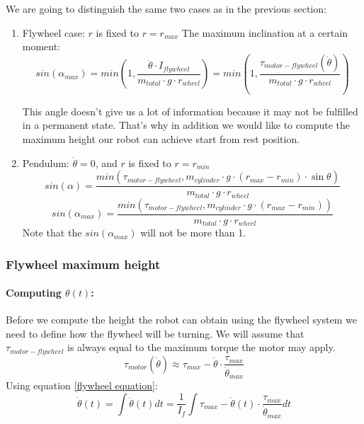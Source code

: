 We are going to distinguish the same two cases as in the previous section:
\begin{enumerate}
    \item Flywheel case: $r$ is fixed to $r = r_{max}$
    The maximum inclination at a certain moment:
    \begin{equation}\label{Maximum angle using flywheel system}
        \boxed{sin(\alpha_{max}) = min(1,\frac{\ddot{\theta}\cdot I_{flywheel}}{m_{total} \cdot  g \cdot  r_{wheel}}) = min(1,\frac{\tau_{motor-flywheel}(\dot{\theta})}{m_{total} \cdot  g \cdot  r_{wheel}})}
    \end{equation}


    This angle doesn't give us a lot of information because it may not be fulfilled in a 
    permanent state. That's why in addition we would like to compute the maximum height
    our robot can achieve start from rest position.
    \item Pendulum: $\dot{\theta} = 0$, and $r$ is fixed to $r = r_{min}$
    \[sin(\alpha) = \frac{min(\tau_{motor-flywheel},m_{cylinder} \cdot  g \cdot  (r_{max} - r_{min}) \cdot  \sin{\theta})}{m_{total} \cdot  g \cdot  r_{wheel}} \]
    \begin{equation}\label{Maximum angle using pendulum system}
        \boxed{sin(\alpha_{max}) = \frac{min(\tau_{motor-flywheel},m_{cylinder} \cdot  g \cdot  (r_{max} - r_{min}))}{m_{total} \cdot  g \cdot  r_{wheel}}}
    \end{equation}
    Note that the $sin(\alpha_{max})$ will not be more than 1.
\end{enumerate}

\subsubsection{Flywheel maximum height}
    \paragraph{Computing $\theta(t)$:} Before we compute the height the robot can obtain using the flywheel system
    we need to define how the flywheel will be turning.
    We will assume that $\tau_{motor-flywheel}$ is always equal to the maximum torque the motor may apply.
    \[\tau_{motor}(\dot{\theta}) \approx \tau_{max}- \dot{\theta}\cdot\frac{\tau_{max}}{\dot{\theta}_{max}}\]
    Using equation \ref{flywheel equation}:
    \[\dot{\theta}(t)=\int \ddot{\theta}(t) dt
    = \frac{1}{I_f} \int \tau_{max}- \dot{\theta}(t)\cdot\frac{\tau_{max}}{\dot{\theta}_{max}} dt \]

